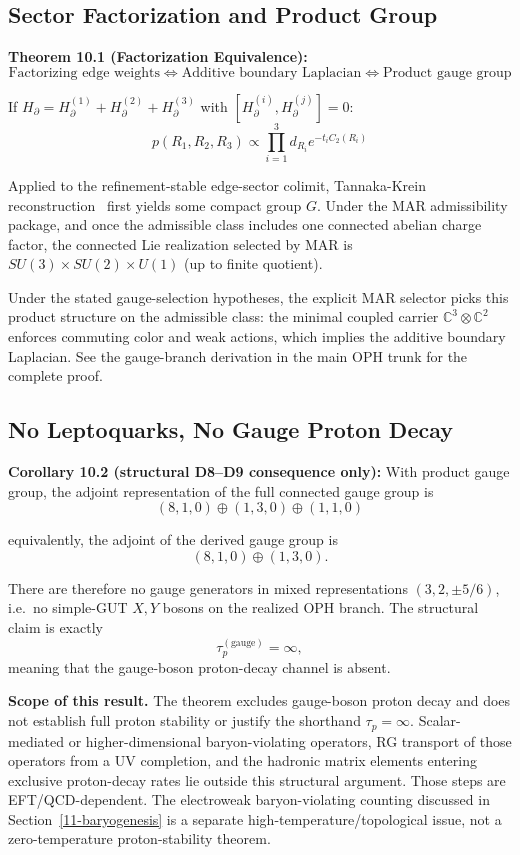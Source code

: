 \subsection{Sector Factorization and Product Group}\label{101-sector-factorization-and-product-group}

\textbf{Theorem 10.1 (Factorization Equivalence):} \[\text{Factorizing edge weights} \Leftrightarrow \text{Additive boundary Laplacian} \Leftrightarrow \text{Product gauge group}\]

If \(H_\partial = H_\partial^{(1)} + H_\partial^{(2)} + H_\partial^{(3)}\) with \([H_\partial^{(i)}, H_\partial^{(j)}] = 0\): \[p(R_1, R_2, R_3) \propto \prod_{i=1}^3 d_{R_i} e^{-t_i C_2(R_i)}\]

Applied to the refinement-stable edge-sector colimit, Tannaka-Krein reconstruction~\cite{tannaka38,krein49,dr89,dr90} first yields some compact group \(G\). Under the MAR admissibility package, and once the admissible class includes one connected abelian charge factor, the connected Lie realization selected by MAR is \(SU(3) \times SU(2) \times U(1)\) (up to finite quotient).

Under the stated gauge-selection hypotheses, the explicit MAR selector picks this product structure on the admissible class: the minimal coupled carrier \(\mathbb{C}^3 \otimes \mathbb{C}^2\) enforces commuting color and weak actions, which implies the additive boundary Laplacian. See the gauge-branch derivation in the main OPH trunk for the complete proof.

\subsection{No Leptoquarks, No Gauge Proton Decay}\label{102-no-leptoquarks-no-gauge-proton-decay}

\textbf{Corollary 10.2 (structural D8--D9 consequence only):} With product gauge group, the adjoint representation of the full connected gauge group is \[(8,1,0) \oplus (1,3,0) \oplus (1,1,0)\]

equivalently, the adjoint of the derived gauge group is
\[
(8,1,0) \oplus (1,3,0).
\]

There are therefore no gauge generators in mixed representations \((3,2,\pm 5/6)\), i.e.\ no simple-GUT \(X,Y\) bosons on the realized OPH branch. The structural claim is exactly
\[
\tau_p^{(\text{gauge})} = \infty,
\]
meaning that the gauge-boson proton-decay channel is absent.

\textbf{Scope of this result.} The theorem excludes gauge-boson proton decay and does not establish full proton stability or justify the shorthand \(\tau_p=\infty\). Scalar-mediated or higher-dimensional baryon-violating operators, RG transport of those operators from a UV completion, and the hadronic matrix elements entering exclusive proton-decay rates lie outside this structural argument. Those steps are EFT/QCD-dependent. The electroweak baryon-violating counting discussed in Section~\ref{11-baryogenesis} is a separate high-temperature/topological issue, not a zero-temperature proton-stability theorem.

